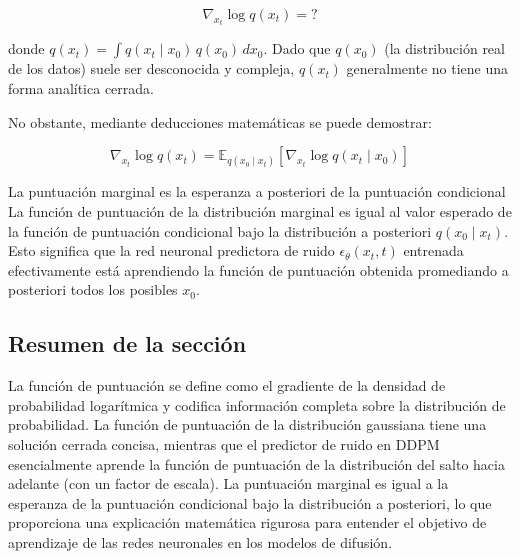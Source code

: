 $$\nabla_{x_t} \log q(x_t) = ?$$

donde $q(x_t) = \int q(x_t \mid x_0)\, q(x_0)\, dx_0$. Dado que $q(x_0)$ (la distribución real de los datos) suele ser desconocida y compleja, $q(x_t)$ generalmente no tiene una forma analítica cerrada.

No obstante, mediante deducciones matemáticas se puede demostrar:

$$\nabla_{x_t} \log q(x_t) = \mathbb{E}_{q(x_0 \mid x_t)}\left[\nabla_{x_t} \log q(x_t \mid x_0)\right]$$

\begin{importantbox}{La puntuación marginal es la esperanza a posteriori de la puntuación condicional}
La función de puntuación de la distribución marginal es igual al valor esperado de la función de puntuación condicional bajo la distribución a posteriori $q(x_0 \mid x_t)$. Esto significa que la red neuronal predictora de ruido $\epsilon_\theta(x_t, t)$ entrenada efectivamente está aprendiendo la función de puntuación obtenida promediando a posteriori todos los posibles $x_0$.
\end{importantbox}

\subsection{Resumen de la sección}

La función de puntuación se define como el gradiente de la densidad de probabilidad logarítmica y codifica información completa sobre la distribución de probabilidad. La función de puntuación de la distribución gaussiana tiene una solución cerrada concisa, mientras que el predictor de ruido en DDPM esencialmente aprende la función de puntuación de la distribución del salto hacia adelante (con un factor de escala). La puntuación marginal es igual a la esperanza de la puntuación condicional bajo la distribución a posteriori, lo que proporciona una explicación matemática rigurosa para entender el objetivo de aprendizaje de las redes neuronales en los modelos de difusión.
